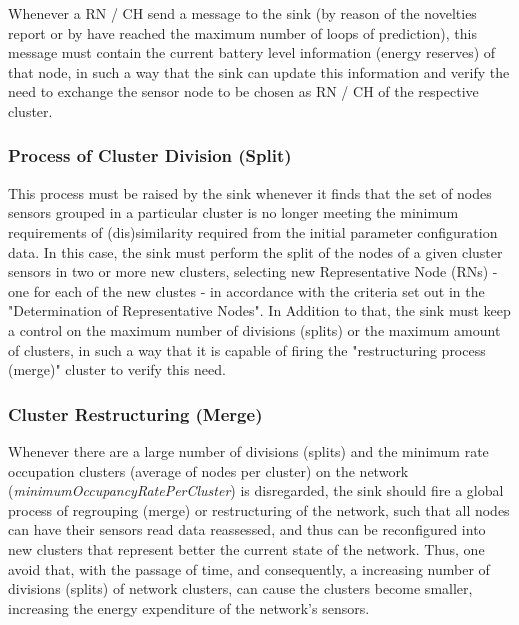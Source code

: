 \documentclass[conference]{IEEEtran}
\begin{document}
Whenever a RN / CH send a message to the sink (by reason of the novelties report
or by have reached the maximum number of loops of prediction), this message must
contain the current battery level information (energy reserves) of that node, in
such a way that the sink can update this information and verify the need to
exchange the sensor node to be chosen as RN / CH of the respective cluster.

\subsubsection{Process of Cluster Division (Split)}

This process must be raised by the sink whenever it finds that the set of nodes
sensors grouped in a particular cluster is no longer meeting the minimum
requirements of (dis)similarity required from the initial parameter
configuration data. In this case, the sink must perform the split of the nodes
of a given cluster sensors in two or more new clusters, selecting new
Representative Node (RNs) - one for each of the new clustes - in accordance with
the criteria set out in the "Determination of Representative Nodes". In Addition
to that, the sink must keep a control on the maximum number of divisions
(splits) or the maximum amount of clusters, in such a way that it is capable of
firing the "restructuring process (merge)" cluster to verify this need.

\subsubsection{Cluster Restructuring (Merge)}

Whenever there are a large number of divisions (splits) and the minimum rate
occupation clusters (average of nodes per cluster) on the network
(\textit{minimumOccupancyRatePerCluster}) is disregarded, the sink should fire a
global process of regrouping (merge) or restructuring of the network, such that
all nodes can have their sensors read data reassessed, and thus can be
reconfigured into new clusters that represent better the current state of the
network. Thus, one avoid that, with the passage of time, and consequently, a
increasing number of divisions (splits) of network clusters, can cause the
clusters become smaller, increasing the energy expenditure of the network's
sensors.

% 
\end{document}
